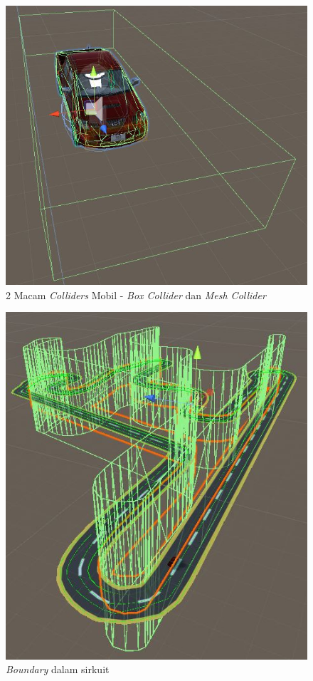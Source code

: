         \begin{figure}  [!htb]
	        \captionsetup{justification=centering}
	        \includegraphics[scale=0.65]{img/colliders.JPG}
	        \caption{2 Macam \textit{Colliders} Mobil - \textit{Box Collider} dan \textit{Mesh Collider}}
	        \label{fig: 3_22}
        \end{figure}
        
        \begin{figure}  [!htb]
	        \captionsetup{justification=centering}
	        \includegraphics[scale=0.7]{img/boundary-inside.JPG}
	        \caption{\textit{Boundary} dalam sirkuit}
	        \label{fig: 3_23}
        \end{figure}
        
